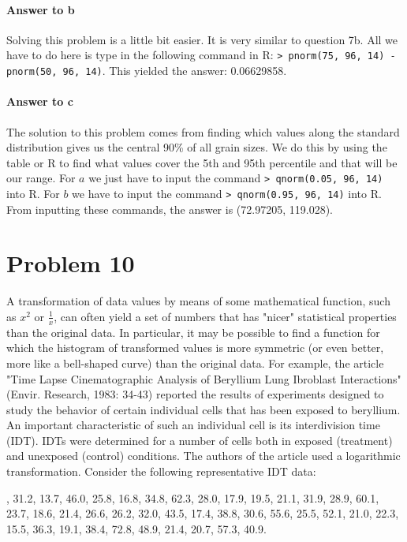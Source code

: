 \documentclass{article}
\begin{document}
	\paragraph{Answer to b}
	Solving this problem is a little bit easier. It is very similar to question 7b. All we have to do here 
	is type in the following command in R: \texttt{> pnorm(75, 96, 14) - pnorm(50, 96, 14)}. This 
	yielded the answer: 0.06629858.
	
	\paragraph{Answer to c}
	The solution to this problem comes from finding which values along the standard distribution 
	gives us the central 90\% of all grain sizes. We do this by using the table or R to find what 
	values cover the 5th and 95th percentile and that will be our range. For $a$ we just have to 
	input the command \texttt{> qnorm(0.05, 96, 14)} into R. For $b$ we have to input the command 
	\texttt{> qnorm(0.95, 96, 14)} into R. From inputting these commands, the answer is (72.97205, 
	119.028).

\clearpage
\section*{Problem 10}

	A transformation of data values by means of some mathematical function, such as $x^2$ or 
	$\frac{1}{x}$, can often yield a set of numbers that has "nicer" statistical properties than the 
	original data. In particular, it may be possible to find a function for which the histogram of 
	transformed values is more symmetric (or even better, more like a bell-shaped curve) than the 
	original data. For example, the article "Time Lapse Cinematographic Analysis of Beryllium Lung 
	Ibroblast Interactions" (Envir. Research, 1983: 34-43) reported the results of experiments 
	designed to study the behavior of certain individual cells that has been exposed to beryllium. An 
	important characteristic of such an individual cell is its interdivision time (IDT). IDTs were 
	determined for a number of cells both in exposed (treatment) and unexposed (control) 
	conditions. The authors of the article used a logarithmic transformation. Consider the following 
	representative IDT data: \vspace{0.5\baselineskip}
	
	, 31.2, 13.7, 46.0, 25.8, 16.8, 34.8, 62.3, 28.0, 17.9, 19.5, 21.1, 31.9, 28.9, 60.1, 
	23.7, 18.6, 21.4, 26.6, 26.2, 32.0, 43.5, 17.4, 38.8, 30.6, 55.6, 25.5, 52.1, 21.0, 22.3, 15.5, 36.3, 
	19.1, 38.4, 72.8, 48.9, 21.4, 20.7, 57.3, 40.9. \vspace{0.5\baselineskip}
	
\end{document}
